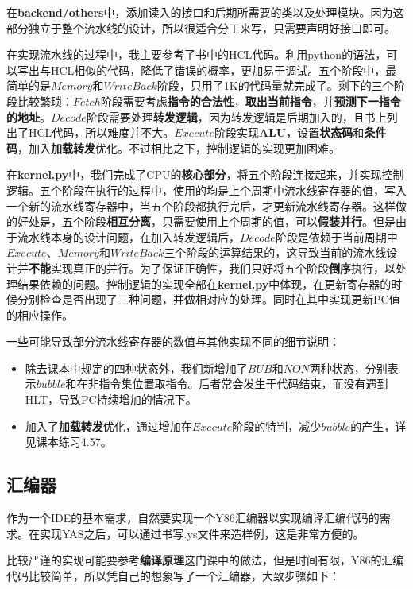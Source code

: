 \documentclass[12pt]{article} %
\begin{document}
\begin{sloppypar}
在{\bf backend/others}中，添加读入的接口和后期所需要的类以及处理模块。因为这部分独立于整个流水线的设计，所以很适合分工来写，只需要声明好接口即可。

在实现流水线的过程中，我主要参考了书中的HCL代码。利用python的语法，可以写出与HCL相似的代码，降低了错误的概率，更加易于调试。五个阶段中，最简单的是$Memory$和$WriteBack$阶段，只用了1K的代码量就完成了。剩下的三个阶段比较繁琐：$Fetch$阶段需要考虑{\bf 指令的合法性}，{\bf 取出当前指令}，并{\bf 预测下一指令的地址}。$Decode$阶段需要处理{\bf 转发逻辑}，因为转发逻辑是后期加入的，且书上列出了HCL代码，所以难度并不大。$Execute$阶段实现{\bf ALU}，设置{\bf 状态码}和{\bf 条件码}，加入{\bf 加载转发}优化。不过相比之下，控制逻辑的实现更加困难。

在{\bf kernel.py}中，我们完成了CPU的{\bf 核心部分}，将五个阶段连接起来，并实现控制逻辑。五个阶段在执行的过程中，使用的均是上个周期中流水线寄存器的值，写入一个新的流水线寄存器中，当五个阶段都执行完后，才更新流水线寄存器。这样做的好处是，五个阶段{\bf 相互分离}，只需要使用上个周期的值，可以{\bf 假装并行}。但是由于流水线本身的设计问题，在加入转发逻辑后，$Decode$阶段是依赖于当前周期中$Execute$、$Memory$和$WriteBack$三个阶段的运算结果的，这导致当前的流水线设计并{\bf 不能}实现真正的并行。为了保证正确性，我们只好将五个阶段{\bf 倒序}执行，以处理结果依赖的问题。控制逻辑的实现全部在{\bf kernel.py}中体现，在更新寄存器的时候分别检查是否出现了三种问题，并做相对应的处理。同时在其中实现更新PC值的相应操作。

一些可能导致部分流水线寄存器的数值与其他实现不同的细节说明：
\begin{itemize}
\item 除去课本中规定的四种状态外，我们新增加了$BUB$和$NON$两种状态，分别表示$bubble$和在非指令集位置取指令。后者常会发生于代码结束，而没有遇到HLT，导致PC持续增加的情况下。
\item 加入了{\bf 加载转发}优化，通过增加在$Execute$阶段的特判，减少$bubble$的产生，详见课本练习4.57。
\end{itemize}

\subsection{汇编器}

作为一个IDE的基本需求，自然要实现一个Y86汇编器以实现编译汇编代码的需求。在实现YAS之后，可以通过书写.ys文件来造样例，这是非常方便的。

比较严谨的实现可能要参考{\bf 编译原理}这门课中的做法，但是时间有限，Y86的汇编代码比较简单，所以凭自己的想象写了一个汇编器，大致步骤如下：


\end{sloppypar}
\end{document}
